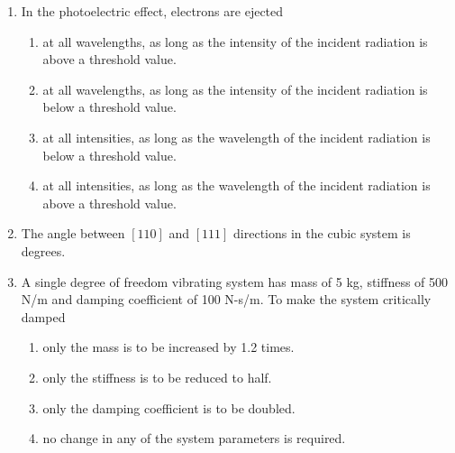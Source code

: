 \documentclass[journal]{IEEEtran}
\numberwithin{equation}{enumi}
\numberwithin{figure}{enumi}
\begin{document}
\begin{enumerate}
    \bigskip

    \item In the photoelectric effect, electrons are ejected
    \begin{enumerate}
        \item at all wavelengths, as long as the intensity of the incident radiation is above a threshold value.
        \item at all wavelengths, as long as the intensity of the incident radiation is below a threshold value.
        \item at all intensities, as long as the wavelength of the incident radiation is below a threshold value.
        \item at all intensities, as long as the wavelength of the incident radiation is above a threshold value.
    \end{enumerate}
    
    \bigskip

    \item The angle between $[110]$ and $[111]$ directions in the cubic system is \underline{\hspace{1cm}} degrees.
    \bigskip
    \item A single degree of freedom vibrating system has mass of 5 kg, stiffness of 500 N/m and damping
    coefficient of 100 N-s/m. To make the system critically damped 
    \begin{enumerate}
        \item only the mass is to be increased by 1.2 times. 
        \item only the stiffness is to be reduced to half. 
        \item only the damping coefficient is to be doubled. 
        \item no change in any of the system parameters is required.
    \end{enumerate}
\end{enumerate}
\end{document}
